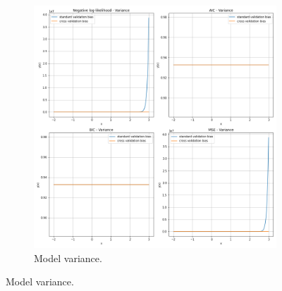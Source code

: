 \documentclass{article}
\begin{document}
\begin{figure}[!htb]
\begin{subfigure}[b]{0.45\textwidth}
         \includegraphics[width=\textwidth]{Q2b_fig4.png}
         \caption{Model variance.}
     \end{subfigure}
     

\end{figure}
\end{document}
